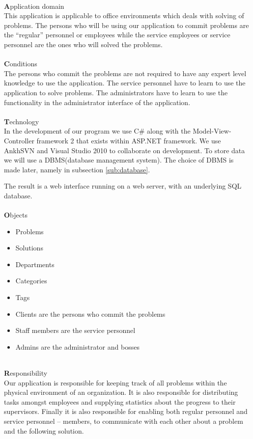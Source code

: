 \ \\
{\Large \textbf{A}}pplication domain \\
This application is applicable to office environments which deals with solving of problems.
The persons who will be using our application to commit problems are the ``regular'' personnel or employees while the service employees or service personnel are the ones who will solved the problems.\\
\ \\
{\Large \textbf{C}}onditions \\ 
The persons who commit the problems are not required to have any expert level knowledge to use the application.
The service personnel have to learn to use the application to solve problems.
The administrators have to learn to use the functionality in the administrator interface of the application. \\
\ \\
{\Large \textbf{T}}echnology \\
In the development of our program we use C\# along with the Model-View-Controller framework 2 that exists within ASP.NET framework.
We use AnkhSVN and Visual Studio 2010 to collaborate on development.
To store data we will use a DBMS(database management system).
The choice of DBMS is made later, namely in subsection \ref{sub:database}.

The result is a web interface running on a web server, with an underlying SQL database.\\
\ \\
{\Large \textbf{O}}bjects
\begin{itemize}
	\item Problems
	\item Solutions
	\item Departments
	\item Categories
	\item Tags
	\item Clients are the persons who commit the problems
	\item Staff members are the service personnel
	\item Admins are the administrator and bosses					
\end{itemize}

\ \\
{\Large \textbf{R}}esponsibility \\
Our application is responsible for keeping track of all problems within the physical environment of an organization.
It is also responsible for distributing tasks amongst employees and supplying statistics about the progress to their supervisors.
Finally it is also responsible for enabling both regular personnel and service personnel -- \astaff[] members, to communicate with each other about a problem and the following solution.

